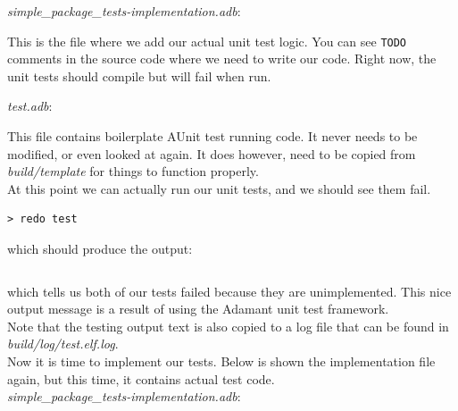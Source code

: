 \textit{simple\_package\_tests-implementation.adb}:


This is the file where we add our actual unit test logic. You can see \texttt{TODO} comments in the source code where we need to write our code. Right now, the unit tests should compile but will fail when run.

\textit{test.adb}:


This file contains boilerplate AUnit test running code. It never needs to be modified, or even looked at again. It does however, need to be copied from \textit{build/template} for things to function properly.  \\

At this point we can actually run our unit tests, and we should see them fail.

\vspace{5mm} %
\begin{verbatim}
> redo test
\end{verbatim}
\vspace{5mm} %

which should produce the output:

\vspace{5mm} %
\inputminted{text}{../example_architecture/simple_package/test_better/output.txt}
\vspace{5mm} %

which tells us both of our tests failed because they are unimplemented. This nice output message is a result of using the Adamant unit test framework. \\

Note that the testing output text is also copied to a log file that can be found in \textit{build/log/test.elf.log}. \\

Now it is time to implement our tests. Below is shown the implementation file again, but this time, it contains actual test code. \\

\textit{simple\_package\_tests-implementation.adb}:


